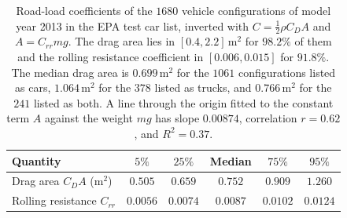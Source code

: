 \begin{table}[htbp]
\centering\small
\caption{Road-load coefficients of the $1680$ vehicle configurations of model year 2013 in the EPA test car list, inverted with $C=\tfrac12\rho C_DA$ and $A=C_{rr}mg$. The drag area lies in $[0.4,2.2]$\,m$^2$ for $98.2\%$ of them and the rolling resistance coefficient in $[0.006,0.015]$ for $91.8\%$. The median drag area is $0.699$\,m$^2$ for the $1061$ configurations listed as cars, $1.064$\,m$^2$ for the $378$ listed as trucks, and $0.766$\,m$^2$ for the $241$ listed as both. A line through the origin fitted to the constant term $A$ against the weight $mg$ has slope $0.00874$, correlation $r=0.62$, and $R^2=0.37$.}\label{tab:app-epa}
\begin{tabular}{lccccc}
\toprule
Quantity & $5\%$ & $25\%$ & Median & $75\%$ & $95\%$\\
\midrule
Drag area $C_DA$ (m$^2$) & $0.505$ & $0.659$ & $0.752$ & $0.909$ & $1.260$\\
Rolling resistance $C_{rr}$ & $0.0056$ & $0.0074$ & $0.0087$ & $0.0102$ & $0.0124$\\
\bottomrule
\end{tabular}
\end{table}
